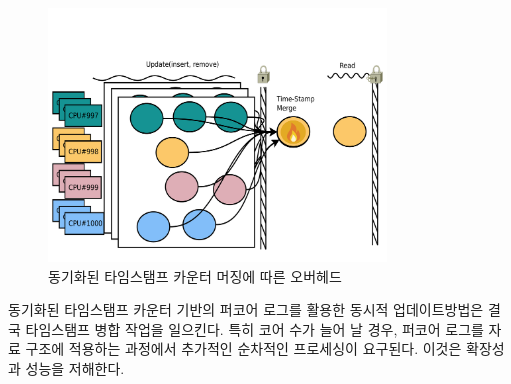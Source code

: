 
\begin{figure}[h]
    \centering
    \includegraphics[width=0.8\textwidth]{fig/oplog_max}
    \caption{동기화된 타임스탬프 카운터 머징에 따른 오버헤드}
  \label{fig:oplog_log}
\end{figure}


동기화된 타임스탬프 카운터 기반의 퍼코어 로그를 활용한 동시적 업데이트방법은 결국
 타임스탬프 병합 작업을 일으킨다.
특히 코어 수가 늘어 날 경우, 퍼코어 로그를 자료 구조에 적용하는 과정에서 추가적인 
순차적인 프로세싱이 요구된다.
이것은 확장성과 성능을 저해한다. 




